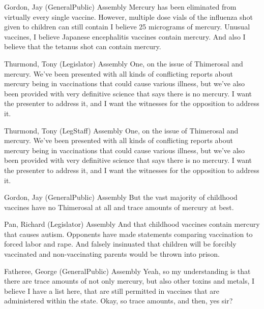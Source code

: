 \begin{result}{10.52969463970219}{Gordon, Jay (GeneralPublic) Assembly}
Mercury has been eliminated from virtually every single vaccine. However, multiple dose vials of the influenza shot given to children can still contain I believe 25 micrograms of mercury. Unusual vaccines, I believe Japanese encephalitis vaccines contain mercury. And also I believe that the tetanus shot can contain mercury.
\end{result}

\begin{result}{9.274900297575922}{Thurmond, Tony (Legislator) Assembly}
One, on the issue of Thimerosal and mercury. We've been presented with all kinds of conflicting reports about mercury being in vaccinations that could cause various illness, but we've also been provided with very definitive science that says there is no mercury. I want the presenter to address it, and I want the witnesses for the opposition to address it.
\end{result}

\begin{result}{9.274900297575922}{Thurmond, Tony (LegStaff) Assembly}
One, on the issue of Thimerosal and mercury. We've been presented with all kinds of conflicting reports about mercury being in vaccinations that could cause various illness, but we've also been provided with very definitive science that says there is no mercury. I want the presenter to address it, and I want the witnesses for the opposition to address it.
\end{result}

\begin{result}{8.845314169917447}{Gordon, Jay (GeneralPublic) Assembly}
But the vast majority of childhood vaccines have no Thimerosal at all and trace amounts of mercury at best.
\end{result}

\begin{result}{7.142469003727607}{Pan, Richard (Legislator) Assembly}
And that childhood vaccines contain mercury that causes autism. Opponents have made statements comparing vaccination to forced labor and rape. And falsely insinuated that children will be forcibly vaccinated and non-vaccinating parents would be thrown into prison.
\end{result}

\begin{result}{7.031493570191112}{Fatheree, George (GeneralPublic) Assembly}
Yeah, so my understanding is that there are trace amounts of not only mercury, but also other toxins and metals, I believe I have a list here, that are still permitted in vaccines that are administered within the state. Okay, so trace amounts, and then, yes sir?
\end{result}

